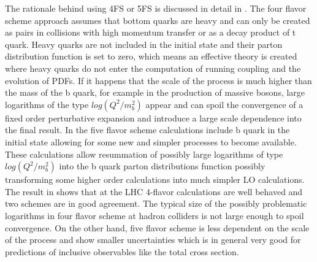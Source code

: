 \par The rationale behind using 4FS or 5FS is discussed in detail in \cite{Maltoni:2012pa}. The four flavor scheme approach assumes that bottom quarks are heavy and can only be created as pairs in collisions with high momentum transfer or as a decay product of t quark. Heavy quarks are not included in the initial state and their parton distribution function is set to zero, which means an effective theory is created where heavy quarks do not enter the computation of running coupling and the evolution of PDFs. If it happens that the scale of the process is much higher than the mass of the b quark, for example in the production of massive bosons, large logarithms of the type $log(Q^2/m_b^2)$ appear and can spoil the convergence of a fixed order perturbative expansion and introduce a large scale dependence into the final result. In the five flavor scheme calculations include b quark in the initial state allowing for some new and simpler processes to become available. These calculations allow resummation of possibly large logarithms of type $log(Q^2/m_b^2)$ into the b quark parton distributions function possibly transforming some higher order calculations into much simpler LO calculations.  
The result in \cite{Maltoni:2012pa} shows that at the LHC 4-flavor calculations are well behaved and two schemes are in good agreement. The typical size of the possibly problematic logarithms in four flavor scheme at hadron colliders is not large enough to spoil convergence. On the other hand, five flavor scheme is less dependent on the scale of the process and show smaller uncertainties which is in general very good for predictions of inclusive observables like the total cross section.  

